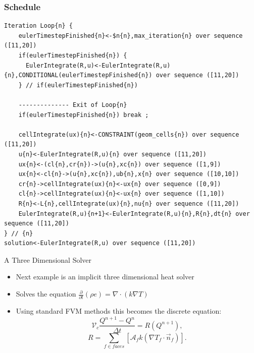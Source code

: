\documentclass{beamer}
\begin{document}
\begin{frame}[fragile=singleslide]\frametitle{Schedule}
\tiny
\begin{verbatim}
Iteration Loop{n} {
    eulerTimestepFinished{n}<-$n{n},max_iteration{n} over sequence ([11,20])
    if(eulerTimestepFinished{n}) {
      EulerIntegrate(R,u)<-EulerIntegrate(R,u){n},CONDITIONAL(eulerTimestepFinished{n}) over sequence ([11,20])
    } // if(eulerTimestepFinished{n})

    -------------- Exit of Loop{n}
    if(eulerTimestepFinished{n}) break ;

    cellIntegrate(ux){n}<-CONSTRAINT(geom_cells{n}) over sequence ([11,20])
    u{n}<-EulerIntegrate(R,u){n} over sequence ([11,20])
    ux{n}<-(cl{n},cr{n})->(u{n},xc{n}) over sequence ([1,9])
    ux{n}<-cl{n}->(u{n},xc{n}),ub{n},x{n} over sequence ([10,10])
    cr{n}->cellIntegrate(ux){n}<-ux{n} over sequence ([0,9])
    cl{n}->cellIntegrate(ux){n}<-ux{n} over sequence ([1,10])
    R{n}<-L{n},cellIntegrate(ux){n},nu{n} over sequence ([11,20])
    EulerIntegrate(R,u){n+1}<-EulerIntegrate(R,u){n},R{n},dt{n} over sequence ([11,20])
} // {n}
solution<-EulerIntegrate(R,u) over sequence ([11,20])
\end{verbatim}
\end{frame}
\begin{frame}{A Three Dimensional Solver}
\begin{itemize}
\item Next example is an implicit three dimensional heat solver
\item Solves the equation $\frac{\partial}{\partial t} (\rho e) = \nabla \cdot (k \nabla T)$
\item Using standard FVM methods this becomes the discrete equation:
\begin{equation*}
\mathcal{V}_c\frac{Q^{n+1}-Q^n}{\Delta t} = R(Q^{n+1}),
\end{equation*}
\begin{equation*}
R = \sum_{f\in{faces}}
\left[ \mathcal{A}_f k \left(\nabla T_f \cdot \vec{n}_f\right)
\right].
\end{equation*}
\end{itemize}
\end{frame}
\end{document}
